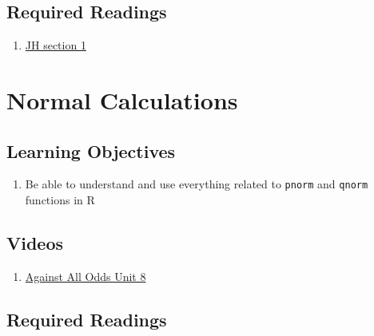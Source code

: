 \documentclass[letterpaper,12pt,twoside,]{pinp}
\providecommand{\tightlist}{%
  \setlength{\itemsep}{0pt}\setlength{\parskip}{0pt}}
\begin{document}
\hypertarget{required-readings}{%
\subsection{Required Readings}\label{required-readings}}

\begin{enumerate}
\def\labelenumi{\arabic{enumi}.}
\tightlist
\item
  \href{https://www.dropbox.com/s/kr293cablb11nrm/Ch13SamplingDistributionsJH2018.pdf?dl=0}{JH
  section 1}
\end{enumerate}

\vspace*{0.25cm}

\hypertarget{normal-calculations}{%
\section{Normal Calculations}\label{normal-calculations}}

\hypertarget{learning-objectives-1}{%
\subsection{Learning Objectives}\label{learning-objectives-1}}

\begin{enumerate}
\def\labelenumi{\arabic{enumi}.}
\tightlist
\item
  Be able to understand and use everything related to \texttt{pnorm} and
  \texttt{qnorm} functions in R
\end{enumerate}

\hypertarget{videos}{%
\subsection{Videos}\label{videos}}

\begin{enumerate}
\def\labelenumi{\arabic{enumi}.}
\tightlist
\item
  \href{https://www.learner.org/series/against-all-odds-inside-statistics/normal-calculations/}{Against
  All Odds Unit 8}
\end{enumerate}

\hypertarget{required-readings-1}{%
\subsection{Required Readings}\label{required-readings-1}}
\end{document}
